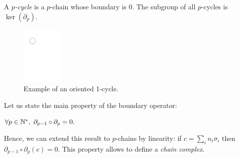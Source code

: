 \begin{defin} 
A {\em $p$-cycle} is a $p$-chain whose boundary is 0. 
The subgroup of all $p$-cycles is $\ker(\partial_{p})$.
\end{defin}



\begin{figure}[h] \centering
\includegraphics[width = 2cm]{figures/Cycles} 
\caption[Cycles]{\label{fig:cycles} Example of an oriented 1-cycle.} 
\end{figure}

Let us state the main property of the boundary operator:

\begin{prop} 
$\forall p\in \N^*,\ \partial_{p-1}\circ\partial_{p} = 0.$
\end{prop}


Hence, we can extend this result to $p$-chains by linearity: if $c=\sum_{i}n_{i}\sigma_{i}$ then $\partial_{p-1}\circ\partial_{p}(c)=0$. 
This property allows to define a {\em chain complex}.

